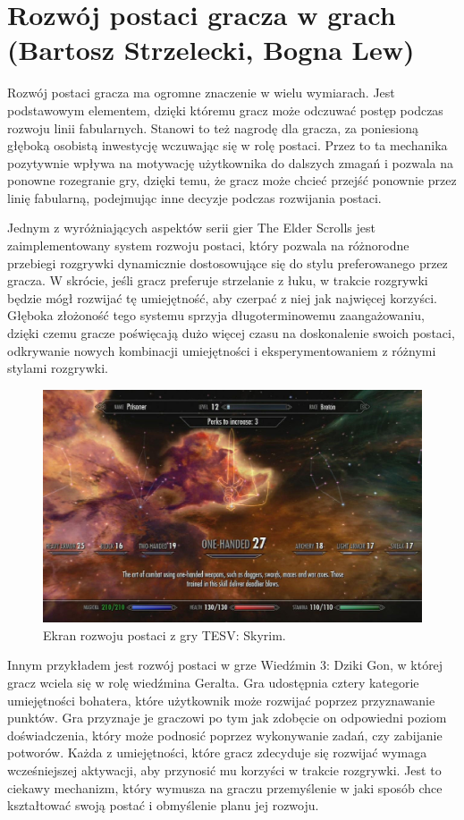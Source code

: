 \section{Rozwój postaci gracza w grach (Bartosz Strzelecki, Bogna Lew)}\label{s:wpr_progres}
Rozwój postaci gracza ma ogromne znaczenie w wielu wymiarach. Jest podstawowym elementem, dzięki któremu gracz może odczuwać postęp podczas rozwoju linii fabularnych. 
Stanowi to też nagrodę dla gracza, za poniesioną głęboką osobistą inwestycję wczuwając się w rolę postaci. Przez to ta mechanika pozytywnie
wpływa na motywację użytkownika do dalszych zmagań i pozwala na ponowne rozegranie gry, dzięki temu, że gracz może chcieć przejść
ponownie przez linię fabularną, podejmując inne decyzje podczas rozwijania postaci.

Jednym z wyróżniających aspektów serii gier The Elder Scrolls jest zaimplementowany system rozwoju postaci, który pozwala na różnorodne
przebiegi rozgrywki dynamicznie dostosowujące się do stylu preferowanego przez gracza. W skrócie, jeśli gracz preferuje strzelanie z łuku,
w trakcie rozgrywki będzie mógł rozwijać tę umiejętność, aby czerpać z niej jak najwięcej korzyści. Głęboka złożoność tego systemu sprzyja długoterminowemu zaangażowaniu,
dzięki czemu gracze poświęcają dużo więcej czasu na doskonalenie swoich postaci, odkrywanie nowych kombinacji umiejętności i eksperymentowaniem z różnymi
stylami rozgrywki.

\begin{figure}[h]
\centering
\includegraphics[width=1.0\textwidth]{images/tes.jpg}
\caption{Ekran rozwoju postaci z gry TESV: Skyrim.}
\end{figure}

Innym przykładem jest rozwój postaci w grze Wiedźmin 3: Dziki Gon, w której gracz wciela się w rolę wiedźmina Geralta.
Gra udostępnia cztery kategorie umiejętności bohatera, które użytkownik może rozwijać poprzez przyznawanie punktów. Gra
przyznaje je graczowi po tym jak zdobęcie on odpowiedni poziom doświadczenia, który może podnosić poprzez wykonywanie
zadań, czy zabijanie potworów. Każda z umiejętności, które gracz zdecyduje się rozwijać wymaga wcześniejszej aktywacji,
aby przynosić mu korzyści w trakcie rozgrywki. Jest to ciekawy mechanizm, który wymusza na graczu przemyślenie w jaki
sposób chce kształtować swoją postać i obmyślenie planu jej rozwoju.

